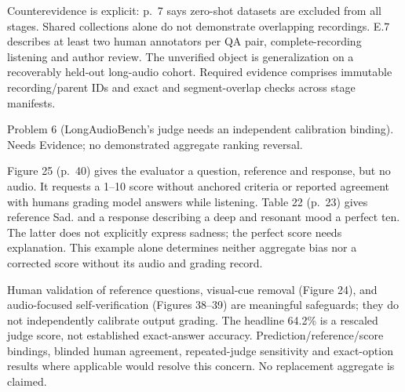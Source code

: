 \documentclass[10pt]{article}
\begin{document}
Counterevidence is explicit: p. 7 says zero-shot datasets are excluded from all stages. Shared collections alone do not demonstrate overlapping recordings. E.7 describes at least two human annotators per QA pair, complete-recording listening and author review. The unverified object is generalization on a recoverably held-out long-audio cohort. Required evidence comprises immutable recording/parent IDs and exact and segment-overlap checks across stage manifests.\par
Problem 6 (LongAudioBench’s judge needs an independent calibration binding).  Needs Evidence; no demonstrated aggregate ranking reversal.\par
Figure 25 (p. 40) gives the evaluator a question, reference and response, but no audio. It requests a 1–10 score without anchored criteria or reported agreement with humans grading model answers while listening. Table 22 (p. 23) gives reference Sad. and a response describing a deep and resonant mood a perfect ten. The latter does not explicitly express sadness; the perfect score needs explanation. This example alone determines neither aggregate bias nor a corrected score without its audio and grading record.\par
Human validation of reference questions, visual-cue removal (Figure 24), and audio-focused self-verification (Figures 38–39) are meaningful safeguards; they do not independently calibrate output grading. The headline 64.2\% is a rescaled judge score, not established exact-answer accuracy. Prediction/reference/score bindings, blinded human agreement, repeated-judge sensitivity and exact-option results where applicable would resolve this concern. No replacement aggregate is claimed.\par
\end{document}
